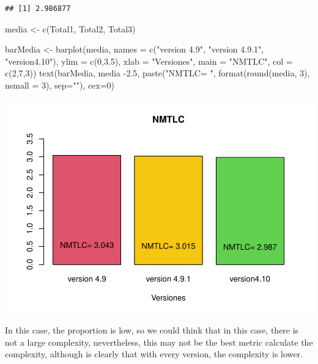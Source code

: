 \documentclass[
]{article}
\newenvironment{Shaded}{\begin{snugshade}}{\end{snugshade}}
\newcommand{\AttributeTok}[1]{\textcolor[rgb]{0.77,0.63,0.00}{#1}}
\newcommand{\DecValTok}[1]{\textcolor[rgb]{0.00,0.00,0.81}{#1}}
\newcommand{\FloatTok}[1]{\textcolor[rgb]{0.00,0.00,0.81}{#1}}
\newcommand{\FunctionTok}[1]{\textcolor[rgb]{0.00,0.00,0.00}{#1}}
\newcommand{\NormalTok}[1]{#1}
\newcommand{\OtherTok}[1]{\textcolor[rgb]{0.56,0.35,0.01}{#1}}
\newcommand{\SpecialCharTok}[1]{\textcolor[rgb]{0.00,0.00,0.00}{#1}}
\newcommand{\StringTok}[1]{\textcolor[rgb]{0.31,0.60,0.02}{#1}}
\begin{document}
\begin{verbatim}
## [1] 2.986877
\end{verbatim}

\begin{Shaded}
\begin{Highlighting}[]
\NormalTok{media }\OtherTok{\textless{}{-}} \FunctionTok{c}\NormalTok{(Total1, Total2, Total3)}

\NormalTok{barMedia }\OtherTok{\textless{}{-}} \FunctionTok{barplot}\NormalTok{(media, }\AttributeTok{names =} \FunctionTok{c}\NormalTok{(}\StringTok{"version 4.9"}\NormalTok{, }\StringTok{"version 4.9.1"}\NormalTok{, }\StringTok{"version4.10"}\NormalTok{), }\AttributeTok{ylim =} \FunctionTok{c}\NormalTok{(}\DecValTok{0}\NormalTok{,}\FloatTok{3.5}\NormalTok{), }\AttributeTok{xlab =} \StringTok{"Versiones"}\NormalTok{, }\AttributeTok{main =} \StringTok{"NMTLC"}\NormalTok{, }\AttributeTok{col =} \FunctionTok{c}\NormalTok{(}\DecValTok{2}\NormalTok{,}\DecValTok{7}\NormalTok{,}\DecValTok{3}\NormalTok{))}
\FunctionTok{text}\NormalTok{(barMedia, media }\SpecialCharTok{{-}}\FloatTok{2.5}\NormalTok{, }\FunctionTok{paste}\NormalTok{(}\StringTok{"NMTLC= "}\NormalTok{, }\FunctionTok{format}\NormalTok{(}\FunctionTok{round}\NormalTok{(media, }\DecValTok{3}\NormalTok{), }\AttributeTok{nsmall =} \DecValTok{3}\NormalTok{), }\AttributeTok{sep=}\StringTok{""}\NormalTok{), }\AttributeTok{cex=}\DecValTok{0}\NormalTok{)}
\end{Highlighting}
\end{Shaded}

\includegraphics{report_files/figure-latex/unnamed-chunk-8-1.pdf}

In this case, the proportion is low, so we could think that in this
case, there is not a large complexity, nevertheless, this may not be the
best metric calculate the complexity, although is clearly that with
every version, the complexity is lower.
\end{document}
